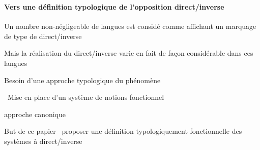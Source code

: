 \begin{frame}
\frametitle{}
\framesubtitle{Vers une définition typologique de l'opposition direct/inverse}
\begin{wideitemize}
\item Un nombre non-négligeable de langues est considé comme affichant un marquage de
  type de direct/inverse
\item Mais la réalisation du direct/inverse varie en fait de façon
  considérable dans ces langues\\ 
\item[\highlighti{\lefthand}] Besoin d'une approche typologique du phénomène
\end{wideitemize}
\begin{wideitemize}
\item[\highlightiv{\lefthand}]~Mise en place d'un système de notions fonctionnel
\item[\highlightiv{\lefthand}] approche canonique
\end{wideitemize}
\begin{wideitemize}
\item[\highlightii{\lefthand}] But de ce papier \lefthand ~proposer une définition typologiquement
  fonctionnelle des systèmes à direct/inverse
\end{wideitemize}
\end{frame}